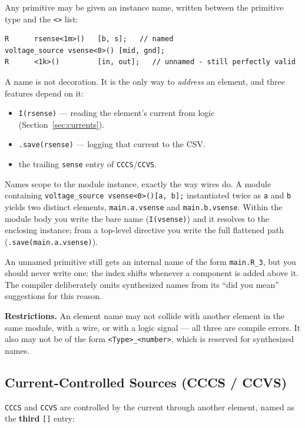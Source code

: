 \documentclass[11pt, a4paper]{article}
\newcommand{\code}[1]{\texttt{\small #1}}
\begin{document}
Any primitive may be given an instance name, written between the primitive type
and the \code{<>} list:

\begin{lstlisting}
R      rsense<1m>()   [b, s];   // named
voltage_source vsense<0>() [mid, gnd];
R      <1k>()         [in, out];   // unnamed - still perfectly valid
\end{lstlisting}

A name is not decoration. It is the only way to \textit{address} an element,
and three features depend on it:

\begin{itemize}
  \item \code{I(rsense)} --- reading the element's current from logic
        (Section~\ref{sec:currents}).
  \item \code{.save(rsense)} --- logging that current to the CSV.
  \item the trailing \code{sense} entry of \code{CCCS}/\code{CCVS}.
\end{itemize}

Names scope to the module instance, exactly the way wires do. A module
containing \code{voltage\_source vsense<0>()[a, b];} instantiated twice as
\code{a} and \code{b} yields two distinct elements, \code{main.a.vsense} and
\code{main.b.vsense}. Within the module body you write the bare name
(\code{I(vsense)}) and it resolves to the enclosing instance; from a top-level
directive you write the full flattened path (\code{.save(main.a.vsense)}).

An unnamed primitive still gets an internal name of the form
\code{main.R\_3}, but you should never write one: the index shifts whenever a
component is added above it. The compiler deliberately omits synthesized names
from its ``did you mean'' suggestions for this reason.

\textbf{Restrictions.} An element name may not collide with another element in
the same module, with a wire, or with a logic signal --- all three are compile
errors. It also may not be of the form \code{<Type>\_<number>}, which is
reserved for synthesized names.

\subsection{Current-Controlled Sources (CCCS / CCVS)}
\label{sec:ccsrc}

\code{CCCS} and \code{CCVS} are controlled by the current through another
element, named as the \textbf{third} \code{[]} entry:
\end{document}

